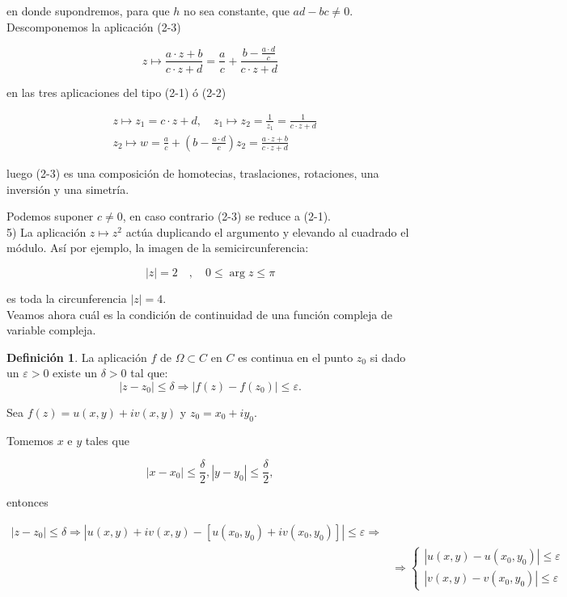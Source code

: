 \documentclass[10pt]{article}
\theoremstyle{plain}
\theoremstyle{definition}
\newtheorem{definition}[theorem]{Definición}
\theoremstyle{remark}
\begin{document}
en donde supondremos, para que $h$ no sea constante, que $a d-b c \neq 0$.\\
Descomponemos la aplicación (2-3)

$$
z \mapsto \frac{a \cdot z+b}{c \cdot z+d}=\frac{a}{c}+\frac{b-\frac{a \cdot d}{c}}{c \cdot z+d}
$$

en las tres aplicaciones del tipo (2-1) ó (2-2)

$$
\begin{aligned}
& z \mapsto z_{1}=c \cdot z+d, \quad z_{1} \mapsto z_{2}=\frac{1}{z_{1}}=\frac{1}{c \cdot z+d} \\
& z_{2} \mapsto w=\frac{a}{c}+\left(b-\frac{a \cdot d}{c}\right) z_{2}=\frac{a \cdot z+b}{c \cdot z+d}
\end{aligned}
$$

luego (2-3) es una composición de homotecias, traslaciones, rotaciones, una inversión y una simetría.

Podemos suponer $c \neq 0$, en caso contrario (2-3) se reduce a (2-1).\\
5) La aplicación $z \mapsto z^{2}$ actúa duplicando el argumento y elevando al cuadrado el módulo. Así por ejemplo, la imagen de la semicircunferencia:

$$
|z|=2 \quad, \quad 0 \leqslant \arg z \leqslant \pi
$$

es toda la circunferencia $|z|=4$.\\
Veamos ahora cuál es la condición de continuidad de una función compleja de variable compleja.

\begin{definition}
La aplicación $f$ de $\Omega \subset C$ en $C$ es continua en el punto $z_{0}$ si dado un $\varepsilon>0$ existe un $\delta>0$ tal que:
$$\left|z-z_{0}\right| \leqslant \delta \Rightarrow\left|f(z)-f\left(z_{0}\right)\right| \leqslant \varepsilon .$$
\end{definition}

Sea $f(z)=u(x, y)+i v(x, y)$ y $z_{0}=x_{0}+i y_{0}$.

Tomemos $x$ e $y$ tales que

$$
\left|x-x_{0}\right| \leqslant \frac{\delta}{2},\left|y-y_{0}\right| \leqslant \frac{\delta}{2},
$$

entonces

$$
\begin{aligned}
\left|z-z_{0}\right| \leqslant \delta \Rightarrow\left|u(x, y)+i v(x, y)-\left[u\left(x_{0}, y_{0}\right)+i v\left(x_{0}, y_{0}\right)\right]\right| \leqslant \varepsilon \Rightarrow & \\
& \Rightarrow\left\{\begin{array}{l}
\left|u(x, y)-u\left(x_{0}, y_{0}\right)\right| \leqslant \varepsilon \\
\left|v(x, y)-v\left(x_{0}, y_{0}\right)\right| \leqslant \varepsilon
\end{array}\right.
\end{aligned}
$$
\end{document}
